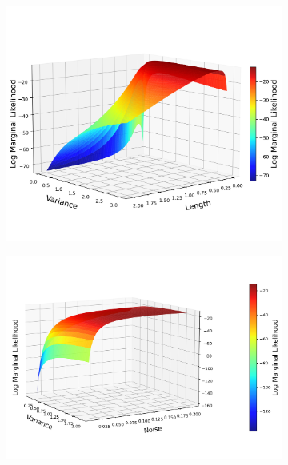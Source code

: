\documentclass[11pt]{article}
\begin{document}
\begin{figure}[H]
    \centering
    \begin{subfigure}[b]{0.4\textwidth}
        \centering
        \includegraphics[width=\textwidth]{LatexPlots/1dplots/Variancevslength.png}
    \end{subfigure}
    \hspace{0.05\textwidth}
    \begin{subfigure}[b]{0.4\textwidth}
        \centering
        \includegraphics[width=\textwidth]{LatexPlots/1dplots/Variancevsnoise.png}
    \end{subfigure}
    \vspace{0.05em}

\end{figure}
\end{document}
